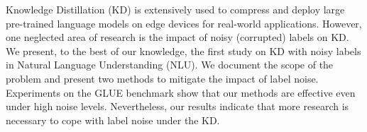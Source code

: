 Knowledge Distillation (KD) is extensively used to compress and deploy large pre-trained language models on edge devices for real-world applications. However, one neglected area of research is the impact of noisy (corrupted) labels on KD. We present, to the best of our knowledge, the first study on KD with noisy labels in Natural Language Understanding (NLU). We document the scope of the problem and present two methods to mitigate the impact of label noise. Experiments on the GLUE benchmark show that our methods are effective even under high noise levels. Nevertheless, our results indicate that more research is necessary to cope with label noise under the KD.
